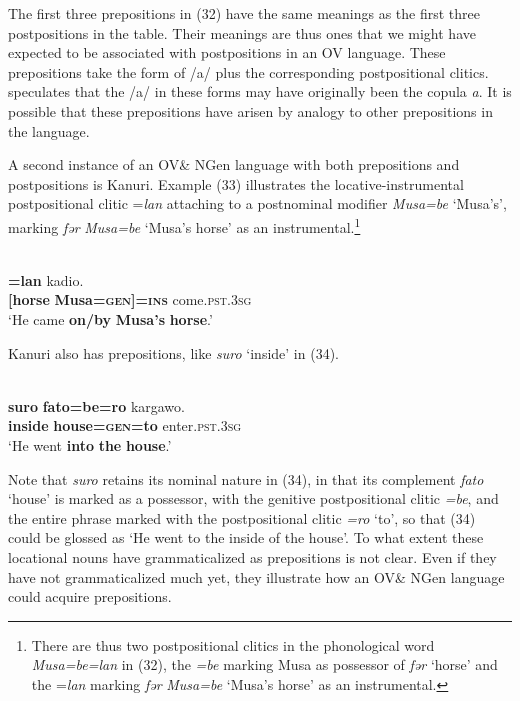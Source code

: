 \documentclass[output=paper]{langsci/langscibook}
\begin{document}
The first three prepositions in (32) have the same meanings as the first three postpositions in the table. Their meanings are thus ones that we might have expected to be associated with postpositions in an OV language. These prepositions take the form of /a/ plus the corresponding postpositional clitics. \citet[102]{Mous1993} speculates that the /a/ in these forms may have originally been the copula \textit{a}. It is possible that these prepositions have arisen by analogy to other prepositions in the language.

A second instance of an OV\& NGen language with both prepositions and postpositions is Kanuri. Example (33) illustrates the locative-instrumental postpositional clitic =\textit{lan} attaching to a postnominal modifier \textit{Musa=be} ‘Musa’s’, marking \textit{fər} \textit{Musa=be} ‘Musa’s horse’ as an instrumental.\footnote{There are thus two postpositional clitics in the phonological word \textit{Musa=be=lan} in (32), the \textit{=be} marking Musa as possessor of \textit{fər} ‘horse’ and the =\textit{lan} marking  \textit{fər} \textit{Musa=be} ‘Musa’s horse’ as an instrumental.}

\ea\label{ex:dryer:}
\\
\gll [\textbf{fər}  \textbf{Musa=be}]\textbf{=lan}  kadio.\\
       \textbf{[horse}  \textbf{Musa=\textsc{gen]=ins}}  come.\textsc{pst.3sg}  \\
\glt ‘He came \textbf{on/by} \textbf{Musa’s} \textbf{horse}.’
\z

Kanuri also has prepositions, like \textit{suro} ‘inside’ in (34).

\ea\label{ex:dryer:}
\\
\gll   \textbf{suro}  \textbf{fato=be=ro}  kargawo.\\
       \textbf{inside}  \textbf{house=\textsc{gen}}\textbf{=to}  enter.\textsc{pst.3sg}\\
\glt   ‘He went \textbf{into} \textbf{the} \textbf{house}.’
\z

Note that \textit{suro} retains its nominal nature in (34), in that its complement \textit{fato} ‘house’ is marked as a possessor, with the genitive postpositional clitic \textit{=be}, and the entire phrase marked with the postpositional clitic \textit{=ro} ‘to’, so that (34) could be glossed as ‘He went to the inside of the house’. To what extent these locational nouns have grammaticalized as prepositions is not clear. Even if they have not grammaticalized much yet, they illustrate how an OV\& NGen language could acquire prepositions.
\end{document}
